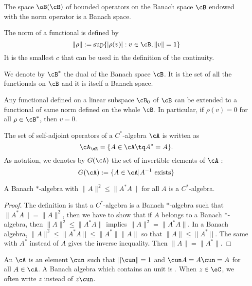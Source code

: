 \begin{proposition}
The space $\oB(\cB)$ of bounded operators on the Banach space $\cB$ endowed with the norm operator is a Banach space. 
\end{proposition}

The norm of a functional is defined by
\[
   \|\rho\|:=\sup\{ |\rho(v)|:v\in\cB,\|v\|=1  \}
\]
It is the smallest $c$ that can be used in the definition of the continuity.

We denote by $\cB^*$ the dual of the Banach space $\cB$. It is the set of all the functionals on $\cB$ and it is itself a Banach space.

\begin{theorem} \label{tho:hahnBanach}
Any functional defined on a linear subspace $\cB_0$ of $\cB$ can be extended to a functional of same norm defined on the whole $\cB$. In particular, if $\rho(v)=0$ for all $\rho\in\cB^*$, then $v=0$.
\end{theorem}



The set of self-adjoint operators of a $C^*$-algebra $\cA$ is written as 
\[
  \cA_{\eR}=\{A\in\cA\tq A^*=A\}.
\]
As notation, we denotes by $G(\cA)$ the set of invertible elements of $\cA$ :
\[
   G(\cA):=\{A\in\cA|A^{-1}\text{ exists}\}
\]

\begin{lemma}
A Banach $*$-algebra with $\|A\|^2\leq\|A^*A\|$ for all $A$ is a $C^*$-algebra.\label{lem:STARAlC}
\end{lemma}

\begin{proof}
The definition is that a $C^*$-algebra is a Banach $*$-algebra such that $\|A^*A\|=\|A\|^2$, then we have to show that  if $A$ belongs to a Banach $*$-algebra, then $\|A\|^2\leq\|A^*A\|$ implies $\|A\|^2=\|A^*A\|$. In a Banach algebra, $\|A\|^2\leq\|A^*A\|\leq\|A^*\|\|A\|$ so that $\|A\|\leq\|A^*\|$. The same with $A^*$ instead of $A$ gives the inverse inequality. Then $\|A\|=\|A^*\|$.
\end{proof}

\begin{definition}
An  $\cA$ is an element $\cun$ such that $\|\cun\|=1$ and $\cun A=A\cun=A$ for all $A\in\cA$. A Banach algebra which contains an unit is . When $z\in\eC$, we often write $z$ instead of $z\cun$.
\end{definition}

